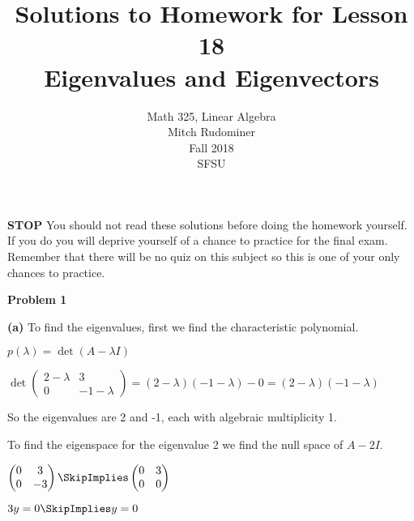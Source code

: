 \documentclass[oneside,12pt]{amsart}
\begin{document}
\title{Solutions to Homework for Lesson 18 \\ Eigenvalues and Eigenvectors}
\author{Math 325, Linear Algebra \\ Mitch Rudominer \\ Fall 2018 \\ SFSU }
\date{}

\maketitle

\bigskip

\textbf{STOP} You should not read these solutions before doing the homework yourself.
If you do you will deprive yourself of a chance to practice for the final exam.
Remember that there will be no quiz on this subject so this is one of your only
chances to practice.

\bigskip

\textbf{Problem 1}

\bigskip

\textbf{(a)} To find the eigenvalues, first we find the characteristic polynomial.

$p(\lambda)=\det(A-\lambda I)$


\bigskip
$
\det
\begin{pmatrix}
2 - \lambda & 3 \\
0 & -1 - \lambda
\end{pmatrix}
= (2-\lambda)(-1-\lambda) - 0 = (2-\lambda)(-1-\lambda)
$

\bigskip

So the eigenvalues are 2 and  -1, each with algebraic multiplicity 1.

\bigskip

To find the eigenspace for the eigenvalue 2 we find the null space of $A-2 I$.

\bigskip

$
\begin{pmatrix}
0 & 3 \\
0 & -3 \\
\end{pmatrix}
\SkipImplies
\begin{pmatrix}
0 & 3 \\
0 & 0 \\
\end{pmatrix}
$

\bigskip

$3y=0 \SkipImplies y=0$

\bigskip
\end{document}
